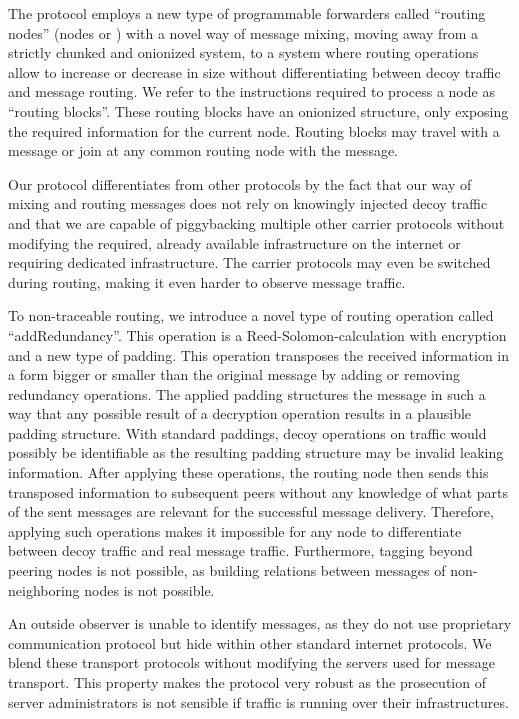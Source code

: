 The protocol employs a new type of programmable forwarders called ``routing nodes'' (nodes or \VortexNodes) with a novel way of message mixing, moving away from a strictly chunked and onionized system, to a system where routing operations allow to increase or decrease in size without differentiating between decoy traffic and message routing. We refer to the instructions required to process a node as ``routing blocks''. These routing blocks have an onionized structure, only exposing the required information for the current node. Routing blocks may travel with a message or join at any common routing node with the message.

Our protocol differentiates from other protocols by the fact that our way of mixing and routing messages does not rely on knowingly injected decoy traffic and that we are capable of piggybacking multiple other carrier protocols without modifying the required, already available infrastructure on the internet or requiring dedicated infrastructure. The carrier protocols may even be switched during routing, making it even harder to observe message traffic. 

To non-traceable routing, we introduce a novel type of routing operation called ``addRedundancy''. This operation is a Reed-Solomon-calculation with encryption and a new type of padding. This operation transposes the received information in a form bigger or smaller than the original message by adding or removing redundancy operations. The applied padding structures the message in such a way that any possible result of a decryption operation results in a plausible padding structure. With standard paddings, decoy operations on traffic would possibly be identifiable as the resulting padding structure may be invalid leaking information. After applying these operations, the routing node then sends this transposed information to subsequent peers without any knowledge of what parts of the sent messages are relevant for the successful message delivery. Therefore, applying such operations makes it impossible for any node to differentiate between decoy traffic and real message traffic. Furthermore, tagging beyond peering nodes is not possible, as building relations between messages of non-neighboring nodes is not possible.

An outside observer is unable to identify messages, as they do not use proprietary communication protocol but hide within other standard internet protocols. We blend these transport protocols without modifying the servers used for message transport. This property makes the protocol very robust as the prosecution of server administrators is not sensible if traffic is running over their infrastructures. 


